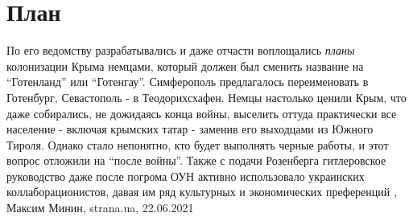  
 
 
 
 
\chapter{План}
\label{sec:slova.plan}

По его ведомству разрабатывались и даже отчасти воплощались \emph{планы} колонизации
Крыма немцами, который должен был сменить название на \enquote{Готенланд} или
\enquote{Готенгау}. Симферополь предлагалось переименовать в Готенбург, Севастополь - в
Теодорихсхафен.  Немцы настолько ценили Крым, что даже собирались, не дожидаясь
конца войны, выселить оттуда практически все население - включая крымских татар
- заменив его выходцами из Южного Тироля. Однако стало непонятно, кто будет
выполнять черные работы, и этот вопрос отложили на \enquote{после войны}.  Также с
подачи Розенберга гитлеровское руководство даже после погрома ОУН активно
использовало украинских коллаборационистов, давая им ряд культурных и
экономических преференций
  , Максим Минин, strana.ua, 22.06.2021
